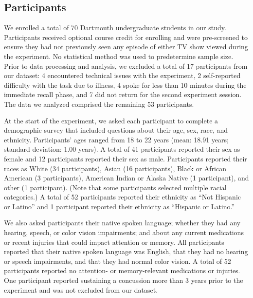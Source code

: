 \documentclass[10pt]{article}
\begin{document}
\subsection*{Participants}

We enrolled a total of 70 Dartmouth undergraduate students in our study. 
Participants received optional course credit for enrolling and were pre-screened to ensure they had not previously seen any episode of either TV show viewed during the experiment. 
No statistical method was used to predetermine sample size. 
Prior to data processing and analysis, we excluded a total of 17 participants from our dataset: 4 encountered technical issues with the experiment, 2 self-reported difficulty with the task due to illness, 4 spoke for less than 10 minutes during the immediate recall phase, and 7 did not return for the second experiment session. 
The data we analyzed comprised the remaining 53 participants.

At the start of the experiment, we asked each participant to complete a demographic survey that included questions about their age, sex, race, and ethnicity.
Participants' ages ranged from 18 to 22 years (mean: 18.91 years; standard deviation: 1.00 years).
A total of 41 participants reported their sex as female and 12 participants reported their sex as male.
Participants reported their races as White (34 participants), Asian (16 participants), Black or African American (3 participants), American Indian or Alaska Native (1 participant), and other (1 participant).
(Note that some participants selected multiple racial categories.)
A total of 52 participants reported their ethnicity as ``Not Hispanic or Latino'' and 1 participant reported their ethnicity as ``Hispanic or Latino.''

We also asked participants their native spoken language; whether they had any hearing, speech, or color vision impairments; and about any current medications or recent injuries that could impact attention or memory.
All participants reported that their native spoken language was English, that they had no hearing or speech impairments, and that they had normal color vision.
A total of 52 participants reported no attention- or memory-relevant medications or injuries. One participant reported sustaining a concussion more than 3 years prior to the experiment and was not excluded from our dataset.
\end{document}
